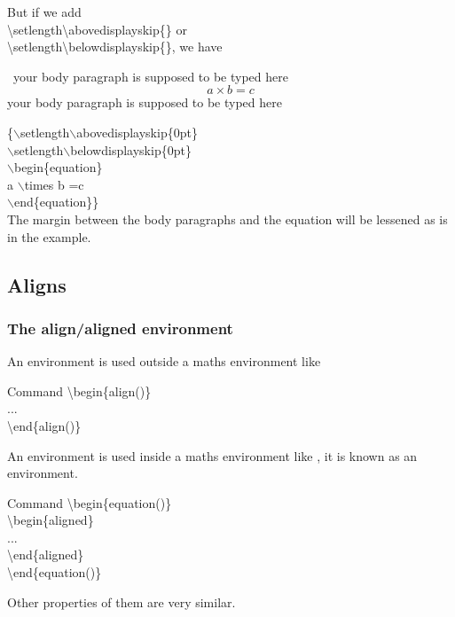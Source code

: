 \documentclass{beamer}
\newenvironment{command}{\begin{block}{Command}}{\end{block}}
\newcommand{\samplecommand}[1]{\alert{\textbackslash #1}}
\begin{document}
\begin{frame}
	But if we add \\
	\samplecommand{setlength}\samplecommand{abovedisplayskip}\{\} or\\
	\samplecommand{setlength}\samplecommand{belowdisplayskip}\{\}, we have
    \begin{example}
		\ your body paragraph is supposed to be typed here
		{\setlength\abovedisplayskip{0pt}
        \setlength\belowdisplayskip{0pt}
        \begin{equation}
         a \times b =c
        \end{equation}}
		your body paragraph is supposed to be typed here
	\end{example}
    {\color{blue}\{$\backslash$setlength$\backslash$abovedisplayskip\{0pt\}
        \\$\backslash$setlength$\backslash$belowdisplayskip\{0pt\}
       \\ $\backslash$begin\{equation\}
         \\a $\backslash$times b =c
        \\$\backslash$end\{equation\}\}}
    \\[0.5em]The margin between the body paragraphs and the equation will be lessened 
    as is in the example.
\end{frame}

\subsection{Aligns}

\begin{frame}
	\frametitle{The align/aligned environment}
	An  environment is used outside a maths environment like 
	\begin{command}
		\samplecommand{begin}\{align(\structure{*})\}\\
		\qquad ...\\
		\samplecommand{end}\{align(\structure{*})\}\\
	\end{command}
	An  environment is used inside a maths environment like , it is known as an  environment.
	\begin{command}
		\samplecommand{begin}\{equation(\structure{*})\}\\
		\qquad\samplecommand{begin}\{aligned\}\\
		\qquad\qquad ...\\
		\qquad\samplecommand{end}\{aligned\}\\
		\samplecommand{end}\{equation(\structure{*})\}\\
	\end{command}
	Other properties of them are very similar.
\end{frame}
\end{document}
